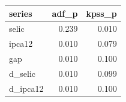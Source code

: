 
\begin{tabular}{lrr}
\toprule
series & adf\_p & kpss\_p\\
\midrule
selic & 0.239 & 0.010\\
ipca12 & 0.010 & 0.079\\
gap & 0.010 & 0.100\\
d\_selic & 0.010 & 0.099\\
d\_ipca12 & 0.010 & 0.100\\
\bottomrule
\end{tabular}
